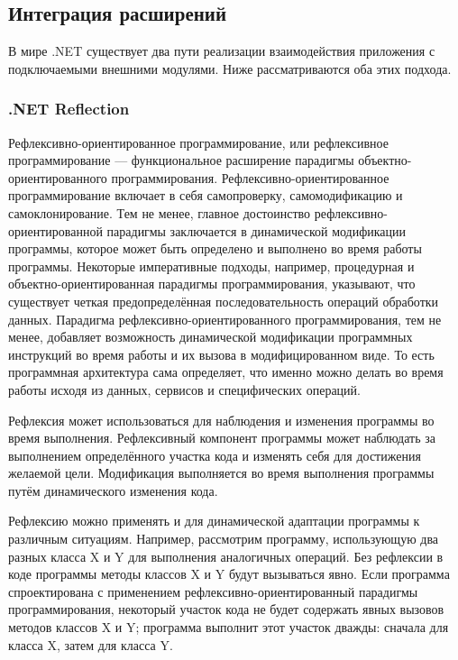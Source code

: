 \subsection{Интеграция расширений}
\label{sec:extention_interaction}

В мире .NET существует два пути реализации взаимодействия приложения с подключаемыми внешними модулями. Ниже рассматриваются оба этих подхода.

\subsubsection{.NET Reflection}

Рефлексивно-ориентированное программирование, или рефлексивное программирование — функциональное расширение парадигмы объектно-ориентированного программирования. Рефлексивно-ориентированное программирование включает в себя самопроверку, самомодификацию и самоклонирование. Тем не менее, главное достоинство рефлексивно-ориентированной парадигмы заключается в динамической модификации программы, которое может быть определено и выполнено во время работы программы. Некоторые императивные подходы, например, процедурная и объектно-ориентированная парадигмы программирования, указывают, что существует четкая предопределённая последовательность операций обработки данных. Парадигма рефлексивно-ориентированного программирования, тем не менее, добавляет возможность динамической модификации программных инструкций во время работы и их вызова в модифицированном виде. То есть программная архитектура сама определяет, что именно можно делать во время работы исходя из данных, сервисов и специфических операций.

Рефлексия может использоваться для наблюдения и изменения программы во время выполнения. Рефлексивный компонент программы может наблюдать за выполнением определённого участка кода и изменять себя для достижения желаемой цели. Модификация выполняется во время выполнения программы путём динамического изменения кода.

Рефлексию можно применять и для динамической адаптации программы к различным ситуациям. Например, рассмотрим программу, использующую два разных класса X и Y для выполнения аналогичных операций. Без рефлексии в коде программы методы классов X и Y будут вызываться явно. Если программа спроектирована с применением рефлексивно-ориентированный парадигмы программирования, некоторый участок кода не будет содержать явных вызовов методов классов X и Y; программа выполнит этот участок дважды: сначала для класса X, затем для класса Y.

